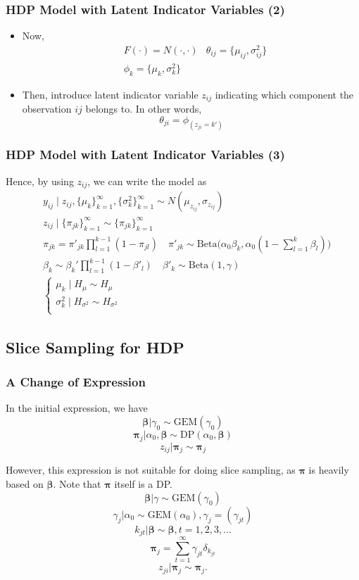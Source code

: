 \documentclass{beamer}
\begin{document}
\begin{frame}
\frametitle{HDP Model with Latent Indicator Variables (2)}
\begin{itemize}
\item Now,
\begin{align*}
&F(\cdot) = N(\cdot,\cdot)
&\theta_{ij} = \{\mu_{ij}, \sigma_{ij}^2\}\\
&\phi_{k} = \{\mu_k, \sigma^2_k\}
\end{align*}
\item Then, introduce latent indicator variable $z_{ij}$ indicating which component the observation $ij$ belongs to. In other words,
$$
\theta_{ji} = \phi_{(z_{ji} = k')}
$$
\end{itemize}

\end{frame}


\begin{frame}
\frametitle{HDP Model with Latent Indicator Variables (3)}
Hence, by using $z_{ij}$, we can write the model as
\begin{align*}
&y_{ij} \mid z_{ij},\{\mu_k\}_{k=1}^\infty,\{\sigma^2_k\}_{k=1}^\infty \sim N(\mu_{z_{ij}},\sigma_{z_{ij}})\\
&z_{ij} \mid \{\pi_{jk}\}_{k=1}^\infty \sim \{\pi_{jk}\}_{k=1}^\infty\\
&\pi_{jk} = \pi'_{jk}\prod_{l = 1}^{k-1}(1 - \pi_{jl})\quad \pi'_{jk} \sim \mathrm{Beta}\biggl(\alpha_0\beta_k, \alpha_0 (1 - \sum_{l=1}^k\beta_l)\biggr)\\
&\beta_k \sim \beta_k' \prod_{l = 1}^{k-1}(1-\beta'_l)\quad \beta'_k \sim \mathrm{Beta}(1, \gamma)\\
&\begin{cases}
\mu_k \mid H_\mu \sim H_{\mu}\\
\sigma^2_k \mid H_{\sigma^2} \sim H_{\sigma^2}\\
\end{cases}
\end{align*}

\end{frame}


\subsection{\small{Slice Sampling for HDP}}
\begin{frame}
	\frametitle{A Change of Expression}
	In the initial expression, we have $$ \bm{\beta}|\gamma_0 \sim \text{GEM}(\gamma_0)$$ $$ \bm{\pi}_j|\alpha_0, \bm{\beta} \sim \text{DP}(\alpha_0, \bm{\beta})$$ $$ z_{ij}|\bm{\pi}_j\sim \bm{\pi}_j $$

	However, this expression is not suitable for doing slice sampling, as $\bm{\pi}$ is heavily based on $\bm{\beta}$. Note that $\bm{\pi}$ itself is a DP.
	$$ \bm{\beta}|\gamma \sim \text{GEM}(\gamma_0)$$ $$ \gamma_j|\alpha_0 \sim \text{GEM}(\alpha_0), \gamma_j=(\gamma_{jt}) $$ $$ k_{jt}|\bm{\beta} \sim \bm{\beta}, t=1, 2, 3, ... $$ $$ \bm{\pi}_j = \sum_{t=1}^\infty \gamma_{jt}\delta_{k_{jt}} $$ $$ z_{ji}|\bm{\pi}_j\sim \bm{\pi}_j. $$
\end{frame}
\end{document}
